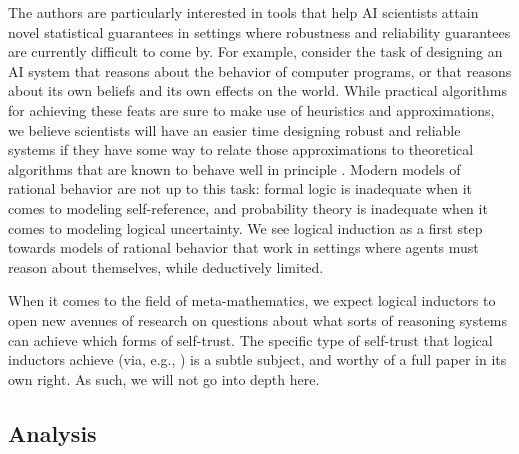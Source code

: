 \documentclass[authordate,onecolumn,noenvironments]{miri-tech-article}
\numberwithin{equation}{subsection}
\begin{document}

The authors are particularly interested in tools that help AI scientists attain novel statistical guarantees in settings where robustness and reliability guarantees are currently difficult to come by. For example, consider the task of designing an AI system that reasons about the behavior of computer programs, or that reasons about its own beliefs and its own effects on the world. While practical algorithms for achieving these feats are sure to make use of heuristics and approximations, we believe scientists will have an easier time designing robust and reliable systems if they have some way to relate those approximations to theoretical algorithms that are known to behave well in principle . Modern models of rational behavior are not up to this task: formal logic is inadequate when it comes to modeling self-reference, and probability theory is inadequate when it comes to modeling logical uncertainty. We see logical induction as a first step towards models of rational behavior that work in settings where agents must reason about themselves, while deductively limited.

When it comes to the field of meta-mathematics, we expect logical inductors to open new avenues of research on questions about what sorts of reasoning systems can achieve which forms of self-trust. The specific type of self-trust that logical inductors achieve (via, e.g., ) is a subtle subject, and worthy of a full paper in its own right. As such, we will not go into depth here.

\subsection{Analysis}\label{sec:analysis}
\end{document}
